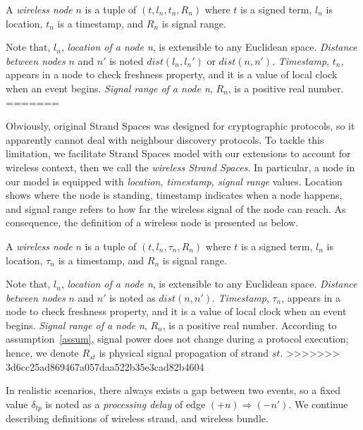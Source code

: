 \begin{flushleft}
\begin{flushleft}
\begin{Definition} A \emph{wireless node} $n$ is a tuple of $(t, l_n, t_n, R_n)$ where $t$ is a signed term, $l_n$ is location, $t_n$ is a timestamp, and $R_n$ is signal range.\end{Definition}

Note that, $l_n$, \textit{location of a node n}, is extensible to any Euclidean space. \textit{Distance between nodes} $n$ and $n'$ is noted $dist(l_n,l_n')$ or $dist(n,n')$. \textit{Timestamp}, $t_n$, appears in a node to check freshness property, and it is a value of local clock when an event begins. \textit{Signal range of a node n}, $R_n$, is a positive real number. 
=======

Obviously, original Strand Spaces was designed for cryptographic protocols, so it apparently cannot deal with neighbour discovery protocols. To tackle this limitation, we facilitate Strand Spaces model with our extensions to account for wireless context, then we call the \textit{wireless Strand Spaces}. In particular, a node in our model is equipped with \textit{location, timestamp, signal range} values. Location shows where the node is standing, timestamp indicates when a node happens, and signal range refers to how far the wireless signal of the node can reach. As consequence, the definition of a wireless node is presented as below.

\begin{Definition} A \emph{wireless node} $n$ is a tuple of $(t, l_n, \tau_{n}, R_n)$ where $t$ is a signed term, $l_n$ is location, $\tau_{n}$ is a timestamp, and $R_n$ is signal range.\end{Definition}

Note that, $l_n$, \textit{location of a node n}, is extensible to any Euclidean space. \textit{Distance between nodes} $n$ and $n'$ is noted as $dist(n,n')$. \textit{Timestamp}, $\tau_{n}$, appears in a node to check freshness property, and it is a value of local clock when an event begins. \textit{Signal range of a node n}, $R_n$, is a positive real number. According to assumption~\ref{assum}, signal power does not change during a protocol execution; hence, we denote $R_{st}$ is physical signal  propagation of strand $st$. 
>>>>>>> 3d6cc25ad869467a057daa522b35e3cad82b4604

In realistic scenarios, there always exists a gap between two events, so a fixed value $\delta_{tp}$ is noted as a \textit{processing delay} of edge $ (+n) \Rightarrow (-n')$. We continue describing definitions of wireless strand, and wireless bundle. 


\end{flushleft}
\end{flushleft}
